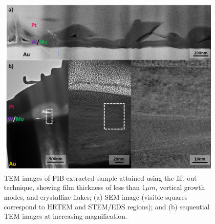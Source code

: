 \begin{figure}[h]
	\begin{center}
		\includegraphics[scale=0.3]{Heterostructures/FIBTEMSEM.png}
		\caption{TEM images of FIB-extracted sample attained using the lift-out technique, showing film thickness of less than 1${\mu}m$, vertical growth modes, and crystalline flakes; (a) SEM image (visible squares correspond to HRTEM and STEM/EDS regions); and (b) sequential TEM images at increasing magnification.}
		\label{fig:HeterostructuresFIBTEMSEM}
	\end{center}
\end{figure}

